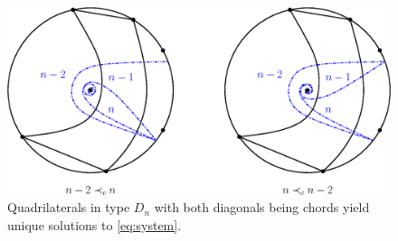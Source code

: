 \documentclass[11pt]{amsart}
\theoremstyle{definition}
\numberwithin{equation}{section}
\numberwithin{figure}{section}
\begin{document}
  \begin{figure}
    \begin{center}
      \includegraphics[scale=0.7]{D_n-roots.eps}
    \end{center}
    \caption{Quadrilaterals in type $D_n$ with both diagonals being chords yield unique solutions to \cref{eq:system}.}
    \label{fig:D_n-roots}
  \end{figure}
\end{document}
